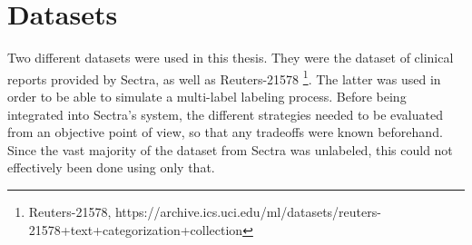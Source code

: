 \section{Datasets}\label{sec:datasets}

Two different datasets were used in this thesis.
They were the dataset of clinical reports provided by Sectra, as well as Reuters-21578 \footnote{Reuters-21578, https://archive.ics.uci.edu/ml/datasets/reuters-21578+text+categorization+collection}.
The latter was used in order to be able to simulate a multi-label labeling process.
Before being integrated into Sectra's system, the different strategies needed to be evaluated from an objective point of view, so that any tradeoffs were known beforehand.
Since the vast majority of the dataset from Sectra was unlabeled, this could not effectively been done using only that.

